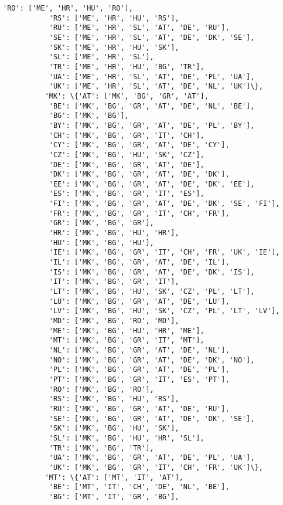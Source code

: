 \documentclass[11pt]{article}
\begin{document}
\begin{Verbatim}[commandchars=\\\{\}]
           'RO': ['ME', 'HR', 'HU', 'RO'],
           'RS': ['ME', 'HR', 'HU', 'RS'],
           'RU': ['ME', 'HR', 'SL', 'AT', 'DE', 'RU'],
           'SE': ['ME', 'HR', 'SL', 'AT', 'DE', 'DK', 'SE'],
           'SK': ['ME', 'HR', 'HU', 'SK'],
           'SL': ['ME', 'HR', 'SL'],
           'TR': ['ME', 'HR', 'HU', 'BG', 'TR'],
           'UA': ['ME', 'HR', 'SL', 'AT', 'DE', 'PL', 'UA'],
           'UK': ['ME', 'HR', 'SL', 'AT', 'DE', 'NL', 'UK']\},
          'MK': \{'AT': ['MK', 'BG', 'GR', 'AT'],
           'BE': ['MK', 'BG', 'GR', 'AT', 'DE', 'NL', 'BE'],
           'BG': ['MK', 'BG'],
           'BY': ['MK', 'BG', 'GR', 'AT', 'DE', 'PL', 'BY'],
           'CH': ['MK', 'BG', 'GR', 'IT', 'CH'],
           'CY': ['MK', 'BG', 'GR', 'AT', 'DE', 'CY'],
           'CZ': ['MK', 'BG', 'HU', 'SK', 'CZ'],
           'DE': ['MK', 'BG', 'GR', 'AT', 'DE'],
           'DK': ['MK', 'BG', 'GR', 'AT', 'DE', 'DK'],
           'EE': ['MK', 'BG', 'GR', 'AT', 'DE', 'DK', 'EE'],
           'ES': ['MK', 'BG', 'GR', 'IT', 'ES'],
           'FI': ['MK', 'BG', 'GR', 'AT', 'DE', 'DK', 'SE', 'FI'],
           'FR': ['MK', 'BG', 'GR', 'IT', 'CH', 'FR'],
           'GR': ['MK', 'BG', 'GR'],
           'HR': ['MK', 'BG', 'HU', 'HR'],
           'HU': ['MK', 'BG', 'HU'],
           'IE': ['MK', 'BG', 'GR', 'IT', 'CH', 'FR', 'UK', 'IE'],
           'IL': ['MK', 'BG', 'GR', 'AT', 'DE', 'IL'],
           'IS': ['MK', 'BG', 'GR', 'AT', 'DE', 'DK', 'IS'],
           'IT': ['MK', 'BG', 'GR', 'IT'],
           'LT': ['MK', 'BG', 'HU', 'SK', 'CZ', 'PL', 'LT'],
           'LU': ['MK', 'BG', 'GR', 'AT', 'DE', 'LU'],
           'LV': ['MK', 'BG', 'HU', 'SK', 'CZ', 'PL', 'LT', 'LV'],
           'MD': ['MK', 'BG', 'RO', 'MD'],
           'ME': ['MK', 'BG', 'HU', 'HR', 'ME'],
           'MT': ['MK', 'BG', 'GR', 'IT', 'MT'],
           'NL': ['MK', 'BG', 'GR', 'AT', 'DE', 'NL'],
           'NO': ['MK', 'BG', 'GR', 'AT', 'DE', 'DK', 'NO'],
           'PL': ['MK', 'BG', 'GR', 'AT', 'DE', 'PL'],
           'PT': ['MK', 'BG', 'GR', 'IT', 'ES', 'PT'],
           'RO': ['MK', 'BG', 'RO'],
           'RS': ['MK', 'BG', 'HU', 'RS'],
           'RU': ['MK', 'BG', 'GR', 'AT', 'DE', 'RU'],
           'SE': ['MK', 'BG', 'GR', 'AT', 'DE', 'DK', 'SE'],
           'SK': ['MK', 'BG', 'HU', 'SK'],
           'SL': ['MK', 'BG', 'HU', 'HR', 'SL'],
           'TR': ['MK', 'BG', 'TR'],
           'UA': ['MK', 'BG', 'GR', 'AT', 'DE', 'PL', 'UA'],
           'UK': ['MK', 'BG', 'GR', 'IT', 'CH', 'FR', 'UK']\},
          'MT': \{'AT': ['MT', 'IT', 'AT'],
           'BE': ['MT', 'IT', 'CH', 'DE', 'NL', 'BE'],
           'BG': ['MT', 'IT', 'GR', 'BG'],

\end{Verbatim}
\end{document}

